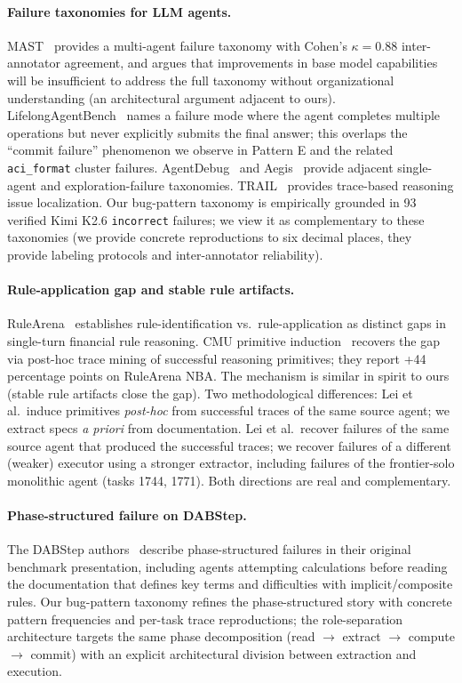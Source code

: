 \documentclass[conference]{IEEEtran}
\newcommand{\Kimi}{Kimi K2.6}
\begin{document}
\paragraph{Failure taxonomies for LLM agents.}
MAST~\cite{mast2025} provides a multi-agent failure taxonomy with Cohen's $\kappa = 0.88$ inter-annotator agreement, and argues that improvements in base model capabilities will be insufficient to address the full taxonomy without organizational understanding (an architectural argument adjacent to ours). LifelongAgentBench~\cite{lifelongAgentBench2025} names a failure mode where the agent completes multiple operations but never explicitly submits the final answer; this overlaps the ``commit failure'' phenomenon we observe in Pattern E and the related \texttt{aci\_format} cluster failures. AgentDebug~\cite{agentErrorTaxonomy2025} and Aegis~\cite{aegis2025} provide adjacent single-agent and exploration-failure taxonomies. TRAIL~\cite{trail2025} provides trace-based reasoning issue localization. Our bug-pattern taxonomy is empirically grounded in 93 verified \Kimi{} \texttt{incorrect} failures; we view it as complementary to these taxonomies (we provide concrete reproductions to six decimal places, they provide labeling protocols and inter-annotator reliability).

\paragraph{Rule-application gap and stable rule artifacts.}
RuleArena~\cite{rulearena2025} establishes rule-identification vs.\ rule-application as distinct gaps in single-turn financial rule reasoning. CMU primitive induction~\cite{cmuPrimitiveInduction2026} recovers the gap via post-hoc trace mining of successful reasoning primitives; they report +44 percentage points on RuleArena NBA. The mechanism is similar in spirit to ours (stable rule artifacts close the gap). Two methodological differences: Lei et al.\ induce primitives \emph{post-hoc} from successful traces of the same source agent; we extract specs \emph{a priori} from documentation. Lei et al.\ recover failures of the same source agent that produced the successful traces; we recover failures of a different (weaker) executor using a stronger extractor, including failures of the frontier-solo monolithic agent (tasks 1744, 1771). Both directions are real and complementary.

\paragraph{Phase-structured failure on DABStep.}
The DABStep authors~\cite{dabstep2025} describe phase-structured failures in their original benchmark presentation, including agents attempting calculations before reading the documentation that defines key terms and difficulties with implicit/composite rules. Our bug-pattern taxonomy refines the phase-structured story with concrete pattern frequencies and per-task trace reproductions; the role-separation architecture targets the same phase decomposition (read $\to$ extract $\to$ compute $\to$ commit) with an explicit architectural division between extraction and execution.
\end{document}
